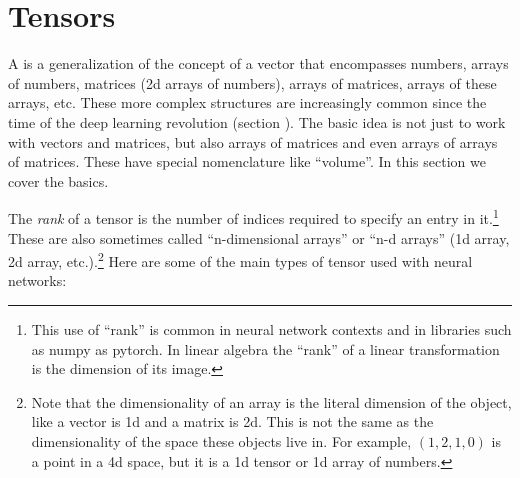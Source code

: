 
\section{Tensors}\label{sect_tensors}


A  is a generalization of the concept of a vector that encompasses numbers, arrays of numbers, matrices (2d arrays of numbers), arrays of matrices, arrays of these arrays, etc. These more complex structures are increasingly common since the time of the deep learning revolution (section ). The basic idea is not just to work with vectors and matrices, but also arrays of matrices and even arrays of arrays of matrices. These have special nomenclature like ``volume''. In this section we cover the basics.

The \emph{rank} of a  tensor is the number of indices required to specify an entry in it.\footnote{This use of ``rank'' is common in neural network contexts and in libraries such as numpy as pytorch. In linear algebra the ``rank''  of a linear transformation is the dimension of its image.} These are also sometimes called ``n-dimensional arrays'' or ``n-d arrays'' (1d array, 2d array, etc.).\footnote{Note that the dimensionality of an array is the literal dimension of the object, like a vector is 1d and a matrix is 2d. This is not the same as the dimensionality of the space these objects live in. For example, $(1,2,1,0)$ is a point in a 4d space, but it is a 1d tensor or 1d array of numbers.} Here are some of the main types of tensor used with neural networks:

